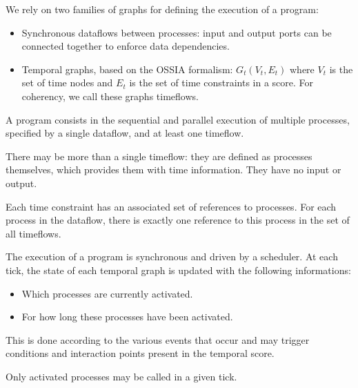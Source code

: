 \documentclass{article}
\begin{document}
    We rely on two families of graphs for defining the execution of a program:
    
    \begin{itemize}
        \item Synchronous dataflows between processes: input and output ports can be connected together to enforce data dependencies.
        \item Temporal graphs, based on the OSSIA formalism: $G_t(V_t, E_t)$ where $V_t$ is the set of time nodes and $E_t$ is the set of time constraints in a score. 
        For coherency, we call these graphs timeflows.
    \end{itemize}

    A program consists in the sequential and parallel execution of multiple processes, specified by a single dataflow, and at least one timeflow.
    
    There may be more than a single timeflow: they are defined as processes themselves, which provides them with time information.
    They have no input or output.
    
    Each time constraint has an associated set of references to processes.
    For each process in the dataflow, there is exactly one reference to this process in the set of all timeflows.
    
    The execution of a program is synchronous and driven by a scheduler.
    At each tick, the state of each temporal graph is updated with the following informations:
    
    \begin{itemize}
        \item Which processes are currently activated.
        \item For how long these processes have been activated.
    \end{itemize}

    This is done according to the various events that occur and may trigger conditions and interaction points present in the temporal score.
    
    Only activated processes may be called in a given tick.
    
    
\end{document}
